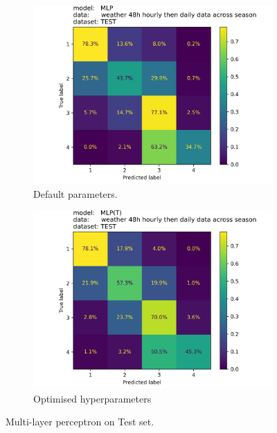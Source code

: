 \documentclass{article}
\begin{document}
	\begin{figure}[h]
		\centering
		\begin{subfigure}[b]{0.49\textwidth}
			\includegraphics[width=\textwidth]{sais_confusion_matrix_MLP____weather_48h_hourly_then_daily_data_across_season_test.png}
			\caption{Default parameters.}
		\end{subfigure}
		\hfill
		\begin{subfigure}[b]{0.49\textwidth}
			\includegraphics[width=\textwidth]{sais_confusion_matrix_MLP(T)_weather_48h_hourly_then_daily_data_across_season_test.png}
			\caption{Optimised hyperparameters}
		\end{subfigure}
		\caption{Multi-layer perceptron on Test set.}
		\label{fig:mlp}
	\end{figure}
\end{document}

